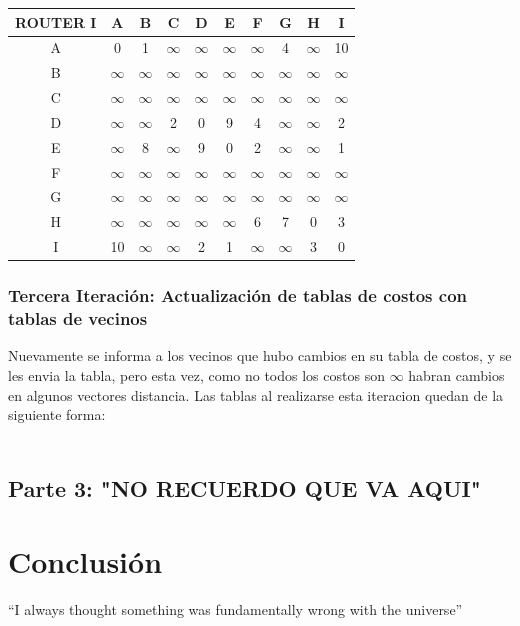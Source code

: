 \documentclass{article}
\begin{document}
\begin{tabular}{ | c | c | c | c | c | c | c | c | c | c |}
\hline                 
ROUTER I    & A      & B      & C      & D      & E      & F      & G      & H      & I      \\
\hline
        A   & 0      & 1      &$\infty$&$\infty$&$\infty$&$\infty$& 4      &$\infty$& 10     \\
\hline
        B   &$\infty$&$\infty$&$\infty$&$\infty$&$\infty$&$\infty$&$\infty$&$\infty$&$\infty$\\
\hline
        C   &$\infty$&$\infty$&$\infty$&$\infty$&$\infty$&$\infty$&$\infty$&$\infty$&$\infty$\\
\hline
        D   &$\infty$&$\infty$& 2      & 0      & 9      & 4      &$\infty$&$\infty$& 2      \\
\hline
        E   &$\infty$& 8      &$\infty$& 9      & 0      & 2      &$\infty$&$\infty$& 1      \\
\hline
        F   &$\infty$&$\infty$&$\infty$&$\infty$&$\infty$&$\infty$&$\infty$&$\infty$&$\infty$\\
\hline
        G   &$\infty$&$\infty$&$\infty$&$\infty$&$\infty$&$\infty$&$\infty$&$\infty$&$\infty$\\
\hline
        H   &$\infty$&$\infty$&$\infty$&$\infty$&$\infty$& 6      & 7      & 0      & 3      \\
\hline 
        I   & 10     &$\infty$&$\infty$& 2      & 1      &$\infty$&$\infty$& 3      & 0      \\
\hline
\end{tabular}

\subsubsection*{Tercera Iteración: Actualización de tablas de costos con tablas de vecinos}
Nuevamente se informa a los vecinos que hubo cambios en su tabla de costos, y se les envia la tabla, pero esta vez, como no todos los costos son $\infty$ habran cambios en algunos vectores distancia. Las tablas al realizarse esta iteracion quedan de la siguiente forma:\\
\\


\subsection{Parte 3: "NO RECUERDO QUE VA AQUI"}

\section{Conclusión}
``I always thought something was fundamentally wrong with the universe'' \citep{adams1995hitchhiker}



\end{document}
